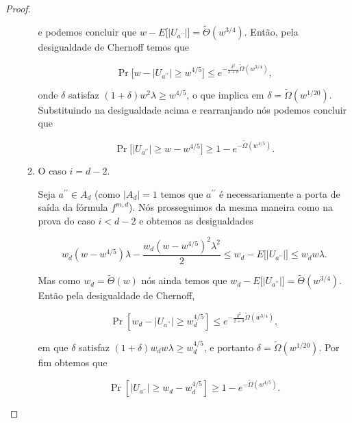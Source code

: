 \begin{proof}
\begin{enumerate}
\begin{enumerate}
		e podemos concluir que $w - E \big[ \lvert U_{a^{\prime \prime}} \rvert \big] = \widetilde{\Theta}(w^{3/4})$. Então, pela desigualdade de Chernoff temos que
		
		\begin{equation*}
			\Pr \Big[ w - \lvert U_{a^{\prime \prime}} \rvert \geq w^{4/5} \Big] \leq e^{-\frac{\delta^{2}}{2 + \delta}\widetilde{\Omega}(w^{3/4})},
		\end{equation*}

		onde $\delta$ satisfaz $(1 + \delta)w^{2}\lambda \geq w^{4/5}$, o que implica em $\delta = \widetilde{\Omega}(w^{1/20})$. Substituindo na desigualdade acima e rearranjando nós podemos concluir que
		
		\begin{equation*}
			\Pr \Big[ \lvert U_{a^{\prime \prime}} \rvert \geq w - w^{4/5} \Big] \geq 1 - e^{-\widetilde{\Omega}(w^{4/5})}.
		\end{equation*}
		
		\item O caso $i = d - 2$.
		
		Seja $a^{\prime \prime} \in A_{d}$ (como $\lvert A_{d} \rvert = 1$ temos que $a^{\prime \prime}$ é necessariamente a porta de saída da fórmula $f^{m, d}$). Nós prosseguimos da mesma maneira como na prova do caso $i < d - 2$ e obtemos as desigualdades
		
		\begin{equation*}
			w_{d}(w - w^{4/5})\lambda - \frac{w_{d}(w - w^{4/5})^{2}\lambda^{2}}{2} \leq w_{d} - E \big[ \lvert U_{a^{\prime \prime}} \rvert \big] \leq w_{d}w\lambda.
		\end{equation*}

		Mas como $w_{d} = \widetilde{\Theta}(w)$ nós ainda temos que $w_{d} - E \big[ \lvert U_{a^{\prime \prime}} \rvert \big] = \widetilde{\Theta}(w^{3/4})$. Então pela desigualdade de Chernoff,
		
		\begin{equation*}
			\Pr[w_{d} - \lvert U_{a^{\prime \prime}} \rvert \geq w_{d}^{4/5}] \leq e^{-\frac{\delta^{2}}{2 + \delta}\widetilde{\Omega}(w^{3/4})},
		\end{equation*}
		
		em que $\delta$ satisfaz $(1 + \delta)w_{d}w\lambda \geq w_{d}^{4/5}$, e portanto $\delta = \widetilde{\Omega}(w^{1/20})$. Por fim obtemos que
		
		\begin{equation*}
			\Pr[\lvert U_{a^{\prime \prime}} \rvert \geq w_{d} - w_{d}^{4/5}] \geq 1 - e^{-\widetilde{\Omega}(w^{4/5})}.
		\end{equation*}

	\end{enumerate}

\end{enumerate}

\end{proof}


